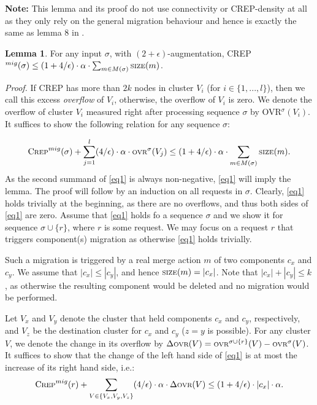 \documentclass[xcolor=dvipsnames, tikz, 11pt]{article}
\newcommand{\crep}{C{\scriptsize REP}}
\newcommand{\size}{\text{\scriptsize SIZE}}
\newcommand{\ovr}{\text{\scriptsize OVR}}
\theoremstyle{definition}
\newtheorem{lemma}[defi]{Lemma}
\begin{document}
\textbf{Note:} This lemma and its proof do not use connectivity or \crep{}-density at all as they only rely on the general migration behaviour and hence is exactly the same as lemma 8 in \cite{Avin2015}.
\begin{lemma}
	For any input $\sigma$, with $(2+\epsilon)$-augmentation, \crep{}$^{mig}(\sigma)\leq(1+4/\epsilon)\cdot\alpha\cdot\sum_{m\in M(\sigma)}\size(m)$.
\end{lemma}

\textit{Proof.} If \crep{} has more than $2k$ nodes in cluster $V_i$ (for $i\in\{1,...,l\}$), then we call this excess \textit{overflow} of $V_i$, otherwise, the overflow of $V_i$ is zero. We denote the overflow of cluster $V_i$ measured right after processing sequence $\sigma$ by OVR$^\sigma(V_i)$. It suffices to show the following relation for any sequence $\sigma$:

\begin{align}
\text{\crep{}}^{mig}(\sigma)+\displaystyle\sum_{j=1}^l(4/\epsilon)\cdot\alpha\cdot\ovr^\sigma(V_j)\leq(1+4/\epsilon)\cdot\alpha\cdot\sum_{m\in M(\sigma)}\size(m).\label{eq1}
\end{align}
As the second summand of \ref{eq1} is always non-negative, \ref{eq1} will imply the lemma.
The proof will follow by an induction on all requests in $\sigma$. Clearly, \ref{eq1} holds trivially at the beginning, as there are no overflows, and thus both sides of \ref{eq1} are zero.
Assume that \ref{eq1} holds fo a sequence $\sigma$ and we show it for sequence $\sigma\cup\{r\}$, where $r$ is some request.
We may focus on a request $r$ that triggers component(s) migration as otherwise \ref{eq1} holds trivially.

Such a migration is triggered by a real merge action $m$ of two components $c_x$ and $c_y$. We assume that $|c_x|\leq|c_y|$, and hence $\size(m)=|c_x|$. Note that $|c_x|+|c_y|\leq k$, as otherwise the resulting component would be deleted and no migration would be performed.

Let $V_x$ and $V_y$ denote the cluster that held components $c_x$ and $c_y$, respectively, and $V_z$ be the destination cluster for $c_x$ and $c_y$ ($z=y$ is possible). For any cluster $V$, we denote the change in its overflow by $\Delta\ovr(V)=\ovr^{\sigma\cup\{r\}}(V)-\ovr{}^{\sigma}(V)$. It suffices to show that the change of the left hand side of \ref{eq1} is at most the increase of its right hand side, i.e.:
\begin{align}
\text{\crep{}}^{mig}(r)+\displaystyle\sum_{V\in\{V_x, V_y, V_z\}}(4/\epsilon)\cdot\alpha\cdot\Delta\ovr{}(V)\leq(1+4/\epsilon)\cdot|c_x|\cdot\alpha.\label{eq2}
\end{align}
\end{document}
